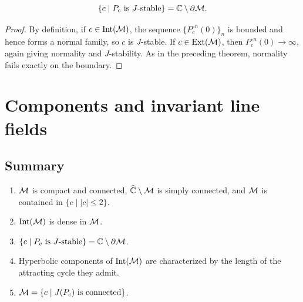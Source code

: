 \documentclass[11pt,a4paper]{article}
\begin{document}
\setcounter{theorem}{5}\begin{corollary}[$J$-stability]
\[
\{c\mid P_c\text{ is }J\text{-stable}\}=\mathbb{C}\setminus\partial\mathcal M.
\]
\end{corollary}
\begin{proof}
By definition, if $c\in\operatorname{Int}(\mathcal M)$, the sequence $\{P_c^{\circ n}(0)\}_n$ is bounded and hence forms a normal family, so $c$ is $J$-stable. If $c\in\operatorname{Ext}(\mathcal M)$, then $P_c^{\circ n}(0)\to\infty$, again giving normality and $J$-stability. As in the preceding theorem, normality fails exactly on the boundary.
\end{proof}

\section{Components and invariant line fields}
\subsection{Summary}
\begin{enumerate}
\setcounter{enumi}{0}\item $\mathcal M$ is compact and connected, $\widehat{\mathbb C}\setminus\mathcal M$ is simply connected, and $\mathcal M$ is contained in $\{c\mid |c|\le2\}$.
\setcounter{enumi}{1}\item $\operatorname{Int}(\mathcal M)$ is dense in $\mathcal M$.
\setcounter{enumi}{2}\item $\{c\mid P_c\text{ is }J\text{-stable}\}=\mathbb{C}\setminus\partial\mathcal M$.
\setcounter{enumi}{3}\item Hyperbolic components of $\operatorname{Int}(\mathcal M)$ are characterized by the length of the attracting cycle they admit.
\setcounter{enumi}{4}\item $\mathcal M=\{c\mid J(P_c)\text{ is connected}\}$.
\end{enumerate}

\end{document}
